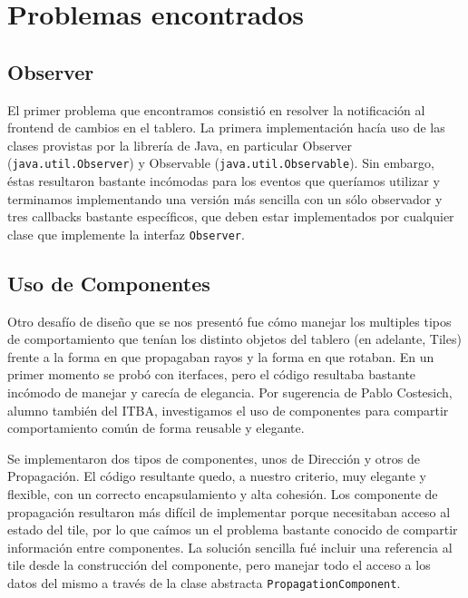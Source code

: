 \documentclass[a4paper, 11pt]{article}
\begin{document}
\section{Problemas encontrados}

	\subsection{Observer}
	El primer problema que encontramos consistió en resolver la notificación al frontend de cambios en el tablero. La primera implementación hacía uso de las clases provistas por la librería de Java, en particular Observer (\texttt{java.util.Observer}) y Observable (\texttt{java.util.Observable}). Sin embargo, éstas resultaron bastante incómodas para los eventos que queríamos utilizar y terminamos implementando una versión más sencilla con un sólo observador y tres callbacks bastante específicos, que deben estar implementados por cualquier clase que implemente la interfaz \texttt{Observer}.

	\subsection{Uso de Componentes}
	Otro desafío de diseño que se nos presentó fue cómo manejar los multiples tipos de comportamiento que tenían los distinto objetos del tablero (en adelante, Tiles) frente a la forma en que propagaban rayos y la forma en que rotaban. En un primer momento se probó con iterfaces, pero el código resultaba bastante incómodo de manejar y carecía de elegancia. Por sugerencia de Pablo Costesich, alumno también del ITBA, investigamos el uso de componentes para compartir comportamiento común de forma reusable y elegante.

	Se implementaron dos tipos de componentes, unos de Dirección y otros de Propagación. El código resultante quedo, a nuestro criterio, muy elegante y flexible, con un correcto encapsulamiento y alta cohesión. Los componente de propagación resultaron más difícil de implementar porque necesitaban acceso al estado del tile, por lo que caímos un el problema bastante conocido de compartir información entre componentes. La solución sencilla fué incluir una referencia al tile desde la construcción del componente, pero manejar todo el acceso a los datos del mismo a través de la clase abstracta \texttt{PropagationComponent}.
\end{document}

